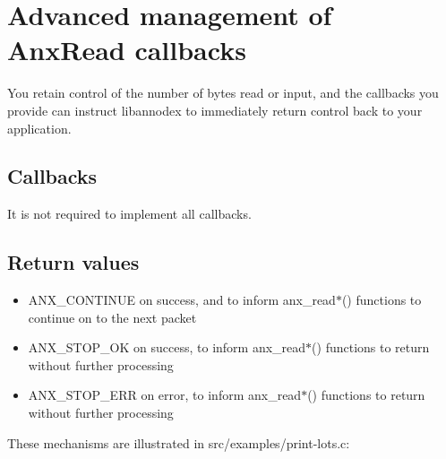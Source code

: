 \section{Advanced management of Anx\-Read callbacks}
\label{group__reading__callbacks}
You retain control of the number of bytes read or input, and the callbacks you provide can instruct libannodex to immediately return control back to your application.\subsection{Callbacks}\label{rcb_list}
It is not required to implement all callbacks.\subsection{Return values}\label{rcb_retvals}
\begin{itemize}
\item ANX\_\-CONTINUE on success, and to inform anx\_\-read$\ast$() functions to continue on to the next packet\item ANX\_\-STOP\_\-OK on success, to inform anx\_\-read$\ast$() functions to return without further processing\item ANX\_\-STOP\_\-ERR on error, to inform anx\_\-read$\ast$() functions to return without further processing\end{itemize}


These mechanisms are illustrated in src/examples/print-lots.c:



